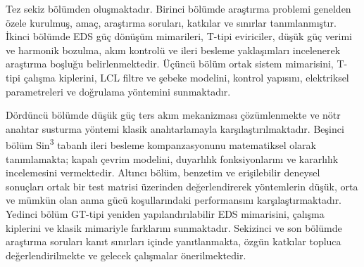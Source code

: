 

Tez sekiz bölümden oluşmaktadır. Birinci bölümde araştırma problemi genelden özele kurulmuş, amaç, araştırma soruları, katkılar ve sınırlar tanımlanmıştır. İkinci bölümde EDS güç dönüşüm mimarileri, T-tipi eviriciler, düşük güç verimi ve harmonik bozulma, akım kontrolü ve ileri besleme yaklaşımları incelenerek araştırma boşluğu belirlenmektedir. Üçüncü bölüm ortak sistem mimarisini, T-tipi çalışma kiplerini, LCL filtre ve şebeke modelini, kontrol yapısını, elektriksel parametreleri ve doğrulama yöntemini sunmaktadır.

Dördüncü bölümde düşük güç ters akım mekanizması çözümlenmekte ve nötr anahtar susturma yöntemi klasik anahtarlamayla karşılaştırılmaktadır. Beşinci bölüm Sin\textsuperscript{3} tabanlı ileri besleme kompanzasyonunu matematiksel olarak tanımlamakta; kapalı çevrim modelini, duyarlılık fonksiyonlarını ve kararlılık incelemesini vermektedir. Altıncı bölüm, benzetim ve erişilebilir deneysel sonuçları ortak bir test matrisi üzerinden değerlendirerek yöntemlerin düşük, orta ve mümkün olan anma gücü koşullarındaki performansını karşılaştırmaktadır. Yedinci bölüm GT-tipi yeniden yapılandırılabilir EDS mimarisini, çalışma kiplerini ve klasik mimariyle farklarını sunmaktadır. Sekizinci ve son bölümde araştırma soruları kanıt sınırları içinde yanıtlanmakta, özgün katkılar topluca değerlendirilmekte ve gelecek çalışmalar önerilmektedir.
